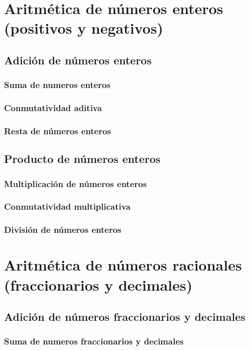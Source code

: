 \documentclass[12pt]{book}
\begin{document}
\begin{mainmatter}
    \section{Aritmética de números enteros (positivos y negativos)}

    \subsection{Adición de n\'umeros enteros}
    \subsubsection{Suma de numeros enteros}
    \subsubsection{Conmutatividad aditiva}
    \subsubsection{Resta de n\'umeros enteros}
    \subsection{Producto de n\'umeros enteros}
    \subsubsection{Multiplicación de números enteros}
    \subsubsection{Conmutatividad multiplicativa}
    \subsubsection{División de números enteros}

    \section{Aritmética de números racionales (fraccionarios y decimales)}

    \subsection{Adición de n\'umeros fraccionarios y decimales}
    \subsubsection{Suma de numeros fraccionarios y decimales}

\end{mainmatter}
\end{document}

